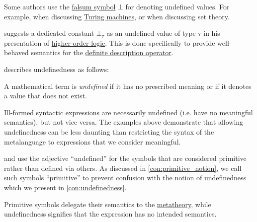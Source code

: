 \begin{comments}
  \item Some authors use the \hyperref[def:propositional_alphabet/constants/falsum]{falsum symbol} \( \bot \) for denoting undefined values. For example,  when discussing \hyperref[def:turing_machine]{Turing machines}, or  when discussing set theory.

   suggests a dedicated constant \( \bot_\tau \) as an undefined value of type \( \tau \) in his presentation of \hyperref[def:simply_typed_hol]{higher-order logic}. This is done specifically to provide well-behaved semantics for the \hyperref[con:denotation/iota]{definite description operator}.

  \item {} describes undefinedness as follows:
  \begin{displayquote}
    A mathematical term is \textit{undeﬁned} if it has no prescribed meaning or if it denotes a value that does not exist.
  \end{displayquote}

  \item Ill-formed syntactic expressions are necessarily undefined (i.e. have no meaningful semantics), but not vice versa. The examples above demonstrate that allowing undefinedness can be less daunting than restricting the syntax of the metalanguage to expressions that we consider meaningful.
\end{comments}

\begin{remark}\label{rem:undefined_and_primitive_terms}
   and  use the adjective \enquote{undefined} for the symbols that are considered primitive rather than defined via others. As discussed in \cref{con:primitive_notion}, we call such symbols \enquote{primitive} to prevent confusion with the notion of undefinedness which we present in \cref{con:undefinedness}.

  Primitive symbols delegate their semantics to the \hyperref[con:metalogic]{metatheory}, while undefinedness signifies that the expression has no intended semantics.
\end{remark}

